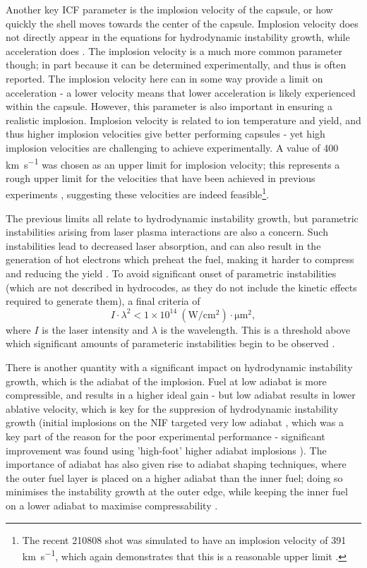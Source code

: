 Another key ICF parameter is the implosion velocity of the capsule, or how quickly the shell moves towards the center of the capsule. Implosion velocity does not directly appear in the equations for hydrodynamic instability growth, while acceleration does \cite{Atzeni2008}. The implosion velocity is a much more common parameter though; in part because it can be determined experimentally, and thus is often reported. The implosion velocity here can in some way provide a limit on acceleration - a lower velocity means that lower acceleration is likely experienced within the capsule. However, this parameter is also important in ensuring a realistic implosion. Implosion velocity is related to ion temperature and yield, and thus higher implosion velocities give better performing capsules - yet high implosion velocities are challenging to achieve experimentally. A value of 400 \unit{\kilo\meter\per\second} was chosen as an upper limit for implosion velocity; this represents a rough upper limit for the velocities that have been achieved in previous experiments \cite{Craxton2015, Callahan2015}, suggesting these velocities are indeed feasible\footnote{The recent 210808 shot was simulated to have an implosion velocity of 391 \unit{\kilo\meter\per\second}, which again demonstrates that this is a reasonable upper limit \cite{Kritcher2022}.}.

The previous limits all relate to hydrodynamic instability growth, but parametric instabilities arising from laser plasma interactions are also a concern. Such instabilities lead to decreased laser absorption, and can also result in the generation of hot electrons which preheat the fuel, making it harder to compress and reducing the yield \cite{Rosenberg2018}. To avoid significant onset of parametric instabilities (which are not described in hydrocodes, as they do not include the kinetic effects required to generate them),  a final criteria of 
\begin{equation} I \cdot \lambda^2 < 1 \times 10^{14} \: (\unit{\watt\per\centi\meter\squared}) \cdot \unit{\micro\meter\squared}, \end{equation}
where $I$ is the laser intensity and $\lambda$ is the wavelength. This is a threshold above which significant amounts of parameteric instabilities begin to be observed \cite{Montgomery2016}.

There is another quantity with a significant impact on hydrodynamic instability growth, which is the adiabat of the implosion. Fuel at low adiabat is more compressible, and results in a higher ideal gain - but low adiabat results in lower ablative velocity, which is key for the suppresion of hydrodynamic instability growth \cite{Betti2016} (initial implosions on the NIF targeted very low adiabat \cite{Lindl2014}, which was a key part of the reason for the poor experimental performance - significant improvement was found using 'high-foot' higher adiabat implosions \cite{Hurricane2014}). The importance of adiabat has also given rise to adiabat shaping techniques, where the outer fuel layer is placed on a higher adiabat than the inner fuel; doing so minimises the instability growth at the outer edge, while keeping the inner fuel on a lower adiabat to maximise compressability \cite{Goncharov2003}.

